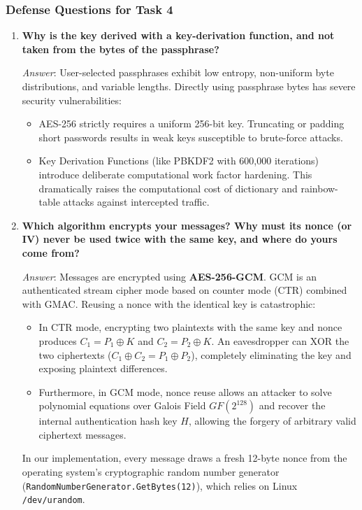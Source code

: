 \documentclass[11pt,a4paper]{article}
\begin{document}
\subsubsection{Defense Questions for Task 4}
\begin{enumerate}[label=\textbf{Q\arabic*.}, leftmargin=*]
    \item \textbf{Why is the key derived with a key-derivation function, and not taken from the bytes of the passphrase?}
    
    \textit{Answer}: User-selected passphrases exhibit low entropy, non-uniform byte distributions, and variable lengths. Directly using passphrase bytes has severe security vulnerabilities:
    \begin{itemize}[noitemsep]
        \item AES-256 strictly requires a uniform 256-bit key. Truncating or padding short passwords results in weak keys susceptible to brute-force attacks.
        \item Key Derivation Functions (like PBKDF2 with 600,000 iterations) introduce deliberate computational work factor hardening. This dramatically raises the computational cost of dictionary and rainbow-table attacks against intercepted traffic.
    \end{itemize}

    \item \textbf{Which algorithm encrypts your messages? Why must its nonce (or IV) never be used twice with the same key, and where do yours come from?}
    
    \textit{Answer}: Messages are encrypted using \textbf{AES-256-GCM}. GCM is an authenticated stream cipher mode based on counter mode (CTR) combined with GMAC. Reusing a nonce with the identical key is catastrophic:
    \begin{itemize}[noitemsep]
        \item In CTR mode, encrypting two plaintexts with the same key and nonce produces $C_1 = P_1 \oplus K$ and $C_2 = P_2 \oplus K$. An eavesdropper can XOR the two ciphertexts ($C_1 \oplus C_2 = P_1 \oplus P_2$), completely eliminating the key and exposing plaintext differences.
        \item Furthermore, in GCM mode, nonce reuse allows an attacker to solve polynomial equations over Galois Field $GF(2^{128})$ and recover the internal authentication hash key $H$, allowing the forgery of arbitrary valid ciphertext messages.
    \end{itemize}
    In our implementation, every message draws a fresh 12-byte nonce from the operating system's cryptographic random number generator (\texttt{RandomNumberGenerator.GetBytes(12)}), which relies on Linux \texttt{/dev/urandom}.


\end{enumerate}
\end{document}

